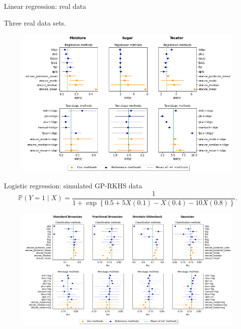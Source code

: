 \documentclass[9pt, english, professionalfonts]{beamer}
\renewcommand{\P} {\ensuremath{\mathds{P}}}
\begin{document}
\begin{frame}{Linear regression: real data}
  \begin{center}
    Three real data sets.
  \end{center}
    \vspace{.5em}
  \begin{figure}
    \includegraphics[width=.8\textwidth]{reg_emcee_real}
  \end{figure}
\end{frame}

\begin{frame}{Logistic regression: simulated GP-RKHS data}
\[
  \P(Y=1\mid X) = \frac{1}{1 + \exp\left\{0.5 +5X(0.1) - X(0.4) - 10X(0.8)\right\}}.
\]
  \begin{figure}
    \includegraphics[width=.95\textwidth]{clf_emcee_rkhs}
  \end{figure}
\end{frame}
\end{document}
